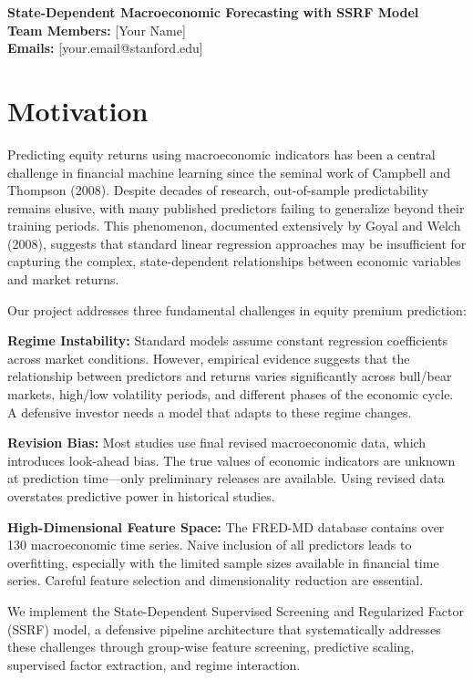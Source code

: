 \documentclass{article}
\begin{document}
\begin{center}
    \textbf{\large State-Dependent Macroeconomic Forecasting with SSRF Model}\\[0.3cm]
    \textbf{Team Members:} [Your Name]\\[0.1cm]
    \textbf{Emails:} [your.email@stanford.edu]\\[0.3cm]
\end{center}

\section{Motivation}

Predicting equity returns using macroeconomic indicators has been a central challenge in financial machine learning since the seminal work of Campbell and Thompson (2008). Despite decades of research, out-of-sample predictability remains elusive, with many published predictors failing to generalize beyond their training periods. This phenomenon, documented extensively by Goyal and Welch (2008), suggests that standard linear regression approaches may be insufficient for capturing the complex, state-dependent relationships between economic variables and market returns.

Our project addresses three fundamental challenges in equity premium prediction:

\textbf{Regime Instability:} Standard models assume constant regression coefficients across market conditions. However, empirical evidence suggests that the relationship between predictors and returns varies significantly across bull/bear markets, high/low volatility periods, and different phases of the economic cycle. A defensive investor needs a model that adapts to these regime changes.

\textbf{Revision Bias:} Most studies use final revised macroeconomic data, which introduces look-ahead bias. The true values of economic indicators are unknown at prediction time---only preliminary releases are available. Using revised data overstates predictive power in historical studies.

\textbf{High-Dimensional Feature Space:} The FRED-MD database contains over 130 macroeconomic time series. Naive inclusion of all predictors leads to overfitting, especially with the limited sample sizes available in financial time series. Careful feature selection and dimensionality reduction are essential.

We implement the State-Dependent Supervised Screening and Regularized Factor (SSRF) model, a defensive pipeline architecture that systematically addresses these challenges through group-wise feature screening, predictive scaling, supervised factor extraction, and regime interaction.
\end{document}

